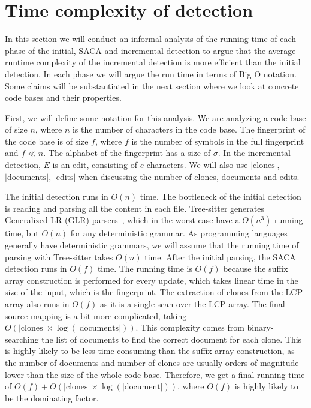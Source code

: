 \section{Time complexity of detection}

In this section we will conduct an informal analysis of the running time of each phase of
the initial, SACA and incremental detection to argue that the average runtime complexity
of the incremental detection is more efficient than the initial detection. In each phase
we will argue the run time in terms of Big O notation. Some claims will be substantiated
in the next section where we look at concrete code bases and their properties.

First, we will define some notation for this analysis. We are analyzing a code base of
size $n$, where $n$ is the number of characters in the code base. The fingerprint of the
code base is of size $f$, where $f$ is the number of symbols in the full fingerprint and
$f \ll n$. The alphabet of the fingerprint has a size of $\sigma$. In the incremental
detection, $E$ is an edit, consisting of $e$ characters. We will also use
$\vert\text{clones}\vert$, $\vert\text{documents}\vert$, $\vert\text{edits}\vert$ when
discussing the number of clones, documents and edits.

The initial detection runs in $O(n)$ time. The bottleneck of the initial detection is
reading and parsing all the content in each file. Tree-sitter generates Generalized LR
(GLR) parsers~\cite{GLR}, which in the worst-case have a $O(n^3)$ running time, but $O(n)$
for any deterministic grammar. As programming languages generally have deterministic
grammars, we will assume that the running time of parsing with Tree-sitter takes $O(n)$
time. After the initial parsing, the SACA detection runs in $O(f)$ time. The running time
is $O(f)$ because the suffix array construction is performed for every update, which takes
linear time in the size of the input, which is the fingerprint. The extraction of clones
from the LCP array also runs in $O(f)$ as it is a single scan over the LCP array. The
final source-mapping is a bit more complicated, taking $O(\vert\text{clones}\vert \times
\log (\vert\text{documents}\vert))$. This complexity comes from binary-searching the list
of documents to find the correct document for each clone. This is highly likely to be less
time consuming than the suffix array construction, as the number of documents and number
of clones are usually orders of magnitude lower than the size of the whole code base.
Therefore, we get a final running time of $O(f) + O(\vert\text{clones}\vert \times
\log(\vert\text{document}\vert))$, where $O(f)$ is highly likely to be the dominating factor.

